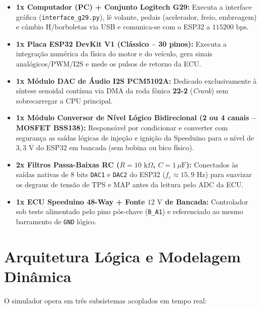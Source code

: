 \documentclass[12pt,a4paper]{article}
\begin{document}
\begin{itemize}[itemsep=3pt]
    \item \textbf{1x Computador (PC) + Conjunto Logitech G29:} Executa a interface gráfica (\texttt{interface\_g29.py}), lê volante, pedais (acelerador, freio, embreagem) e câmbio H/borboletas via USB e comunica-se com o ESP32 a $115200\text{ bps}$.
    \item \textbf{1x Placa ESP32 DevKit V1 (Clássico -- 30 pinos):} Executa a integração numérica da física do motor e do veículo, gera sinais analógicos/PWM/I2S e mede os pulsos de retorno da ECU.
    \item \textbf{1x Módulo DAC de Áudio I2S PCM5102A:} Dedicado exclusivamente à síntese senoidal contínua via DMA da roda fônica \textbf{22-2} (\textit{Crank}) sem sobrecarregar a CPU principal.
    \item \textbf{1x Módulo Conversor de Nível Lógico Bidirecional (2 ou 4 canais -- MOSFET BSS138):} Responsável por condicionar e converter com segurança as saídas lógicas de injeção e ignição da Speeduino para o nível de $3{,}3\text{ V}$ do ESP32 em bancada (sem bobina ou bico físico).
    \item \textbf{2x Filtros Passa-Baixas RC ($R = 10\text{ k}\Omega$, $C = 1\,\mu\text{F}$):} Conectados às saídas nativas de 8 bits \texttt{DAC1} e \texttt{DAC2} do ESP32 ($f_c \approx 15{,}9\text{ Hz}$) para suavizar os degraus de tensão de TPS e MAP antes da leitura pelo ADC da ECU.
    \item \textbf{1x ECU Speeduino 48-Way + Fonte $12\text{ V}$ de Bancada:} Controlador sob teste alimentado pelo pino pós-chave (\texttt{B\_A1}) e referenciado ao mesmo barramento de \texttt{GND} lógico.
\end{itemize}

\section{Arquitetura Lógica e Modelagem Dinâmica}

O simulador opera em três subsistemas acoplados em tempo real:
\end{document}
